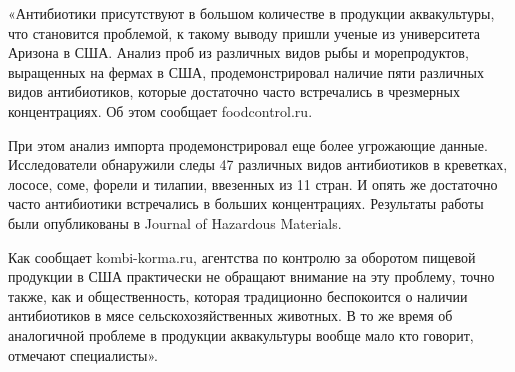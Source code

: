 
«Антибиотики присутствуют в большом количестве в продукции аквакультуры, что становится проблемой, к такому выводу пришли ученые из университета Аризона в США. Анализ проб из различных видов рыбы и морепродуктов, выращенных на фермах в США, продемонстрировал наличие пяти различных видов антибиотиков, которые достаточно часто встречались в чрезмерных концентрациях. Об этом сообщает foodcontrol.ru.

При этом анализ импорта продемонстрировал еще более угрожающие данные. Исследователи обнаружили следы 47 различных видов антибиотиков в креветках, лососе, соме, форели и тилапии, ввезенных из 11 стран. И опять же достаточно часто антибиотики встречались в больших концентрациях. Результаты работы были опубликованы в Journal of Hazardous Materials.

Как сообщает kombi-korma.ru, агентства по контролю за оборотом пищевой продукции в США практически не обращают внимание на эту проблему, точно также, как и общественность, которая традиционно беспокоится о наличии антибиотиков в мясе сельскохозяйственных животных. В то же время об аналогичной проблеме в продукции аквакультуры вообще мало кто говорит, отмечают специалисты».

